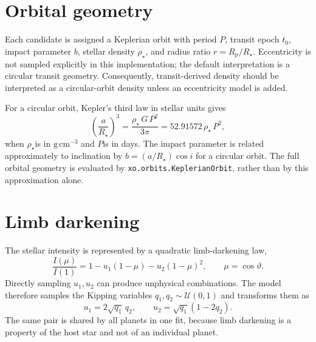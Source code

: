 \documentclass[12pt,a4paper,oneside]{report}
\newcommand{\Rstar}{\ensuremath{R_{\star}}}
\newcommand{\rhoStar}{\ensuremath{\rho_{\star}}}
\newcommand{\Rp}{\ensuremath{R_{\mathrm{p}}}}
\newcommand{\Porb}{\ensuremath{P}}
\newcommand{\tzero}{\ensuremath{t_{0}}}
\newcommand{\code}[1]{\texttt{\small #1}}
\begin{document}
\section{Orbital geometry}
Each candidate is assigned a Keplerian orbit with period \Porb, transit epoch
\tzero, impact parameter \(b\), stellar density \rhoStar, and radius ratio
\(r=\Rp/\Rstar\). Eccentricity is not sampled explicitly in this implementation;
the default interpretation is a circular transit geometry. Consequently,
transit-derived density should be interpreted as a circular-orbit density unless
an eccentricity model is added.

For a circular orbit, Kepler's third law in stellar units gives
\begin{equation}
  \left(\frac{a}{\Rstar}\right)^3
  =\frac{\rhoStar\,G\,\Porb^2}{3\pi}
  =52.91572\,\rhoStar\,\Porb^2,
\end{equation}
when \rhoStar is in \(\mathrm{g\,cm^{-3}}\) and \Porb is in days. The impact parameter
is related approximately to inclination by \(b=(a/\Rstar)\cos i\) for a
circular orbit. The full orbital geometry is evaluated by
\code{xo.orbits.KeplerianOrbit}, rather than by this approximation alone.

\section{Limb darkening}
The stellar intensity is represented by a quadratic limb-darkening law,
\begin{equation}
  \frac{I(\mu)}{I(1)}=1-u_1(1-\mu)-u_2(1-\mu)^2,
  \qquad \mu=\cos\vartheta.
\end{equation}
Directly sampling \(u_1,u_2\) can produce unphysical combinations. The model
therefore samples the Kipping variables \(q_1,q_2\sim\mathcal{U}(0,1)\) and
transforms them as
\begin{equation}
  u_1=2\sqrt{q_1}\,q_2,
  \qquad
  u_2=\sqrt{q_1}(1-2q_2).
\end{equation}
The same pair is shared by all planets in one fit, because limb darkening is a
property of the host star and not of an individual planet.
\end{document}

